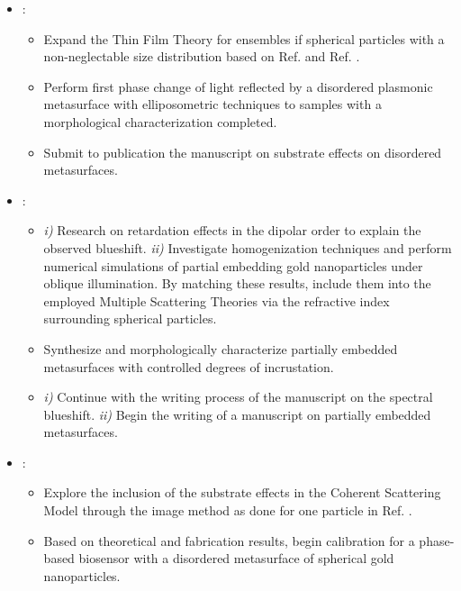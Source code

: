 \begin{itemize}
	\renewcommand\labelitemi{\textcolor{pblueFC}{$\blacktriangleright$}}
	\renewcommand\labelitemii{\textcolor{sredFC}{$\blacktriangleright$}}
	\setlength\itemsep{.5em}
	\item {}: 
		 \begin{itemize}
		 	\item {} Expand the Thin Film Theory for ensembles if spherical particles with a non-neglectable size distribution based on Ref. \cite{vazquez-estrada_optical_2014} and Ref. \cite{toudert_advanced_2012}.
		 	\item{} Perform first phase change of light  reflected by a disordered plasmonic metasurface with elliposometric techniques to samples with a morphological characterization completed.
		 	\item{} Submit to publication the manuscript  on substrate effects on disordered metasurfaces. 
		 \end{itemize}
	\item {}:
		\begin{itemize}
			\item {} \textit{i)} Research on retardation effects in the dipolar order to explain the observed blueshift. \textit{ii)} Investigate homogenization techniques  and perform numerical simulations of partial embedding gold nanoparticles under oblique illumination. By matching these results, include them into the employed Multiple Scattering Theories via the refractive index surrounding spherical particles.
			\item{} Synthesize and morphologically characterize partially embedded metasurfaces with controlled degrees of incrustation.
			\item{} \textit{i)} Continue  with the writing process of the manuscript on the spectral blueshift. \textit{ii)} Begin the writing of a manuscript on partially embedded metasurfaces.
		\end{itemize}	 
	\item {}:
		\begin{itemize}
			\item {} Explore the inclusion of the substrate effects in the Coherent Scattering Model through the image method as done for one particle in Ref. \cite{bosi_optical_1996}.
			\item{} Based on theoretical and fabrication results, begin calibration for a phase-based biosensor with a disordered metasurface of spherical gold nanoparticles. 

\end{itemize}
\end{itemize}
